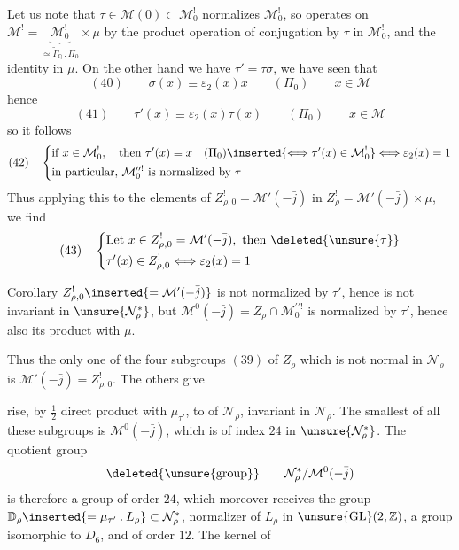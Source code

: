 

Let us note that $\tau\in\mathcal{M}(0)\subset\mathcal{M}_{0}^{!}$
normalizes $\mathcal{M}_{0}^{!}$, so
 operates
 on
$\mathcal{M}^{!}
=\underbrace{\mathcal{M}_{0}^{!}}_{\simeq\widetilde{\Gamma}_{\mathbb{Q}}\mathbin{.}\Pi_{0}}
\times\mu$
by the product operation of conjugation by $\tau$ in
$\mathcal{M}_{0}^{!}$, and the identity in $\mu$.
On the other hand we have $\tau'=\tau\sigma$, we have seen that
\[
 (40)\qquad
 \sigma(x)\equiv\varepsilon_{2}(x)x\qquad(\Pi_{0})
 \qquad x\in\mathcal{M}
\]
hence
\[
 (41)\qquad
 \tau'(x)\equiv\varepsilon_{2}(x)\tau(x)\qquad(\Pi_{0})
 \qquad x\in\mathcal{M}
\]
so it follows
\[
 (42)\quad
 \left\{
 \begin{aligned}
 &\text{if }x\in\mathcal{M}_{0}^{!},\quad
   \text{then }\tau'(x)\equiv x\quad(\Pi_{0})
   \inserted{\Longleftrightarrow\tau'(x)\in\mathcal{M}_{0}^{!}}
   \Longleftrightarrow\varepsilon_{2}(x)=1\\
 &\text{in particular, }\mathcal{M}_{0}^{\prime\prime!}
   \text{ is normalized by }\tau
 \end{aligned}
 \right.
\]
Thus  applying this to the elements of
$Z_{\rho,0}^{!}=\mathcal{M}'(-\bar j)$ in
$Z_{\rho}^{!}=\mathcal{M}'(-\bar j)\times\mu$,
we find
\[
 (43)\quad
 \left\{
 \begin{aligned}
 &\text{Let }x\in Z_{\rho,0}^{!}=\mathcal{M}'(-\bar j),
   \text{ then }\deleted{\unsure{\tau}}\\
 &\tau'(x)\in Z_{\rho,0}^{!}
   \Longleftrightarrow\varepsilon_{2}(x)=1
 \end{aligned}
 \right.
\]

\uline{Corollary}\quad
$Z_{\rho,0}^{!}\inserted{=\mathcal{M}'(-\bar j)}$
is not normalized by $\tau'$, hence is not invariant in
$\unsure{\mathcal{N}_{\rho}^{*}}$,
but 
$\mathcal{M}^{0}(-\bar j)=Z_{\rho}\cap\mathcal{M}_{0}^{\prime\prime!}$
is normalized by $\tau'$, hence also its product with $\mu$.

Thus the only one of the four subgroups $(39)$ of $Z_{\rho}$
which is not normal in $\mathcal{N}_{\rho}$ is
$\mathcal{M}'(-\bar j)=Z_{\rho,0}^{!}$.
The others give



rise, by $\frac12$ direct product with $\mu_{\tau'}$,
to  of $\mathcal{N}_{\rho}$,
invariant in $\mathcal{N}_{\rho}$.
The smallest of all these subgroups is
$\mathcal{M}^{0}(-\bar j)$, which is of index $24$ in
$\unsure{\mathcal{N}_{\rho}^{*}}$.
The quotient group 
\[
 \deleted{\unsure{\text{group}}}\qquad
 \mathcal{N}_{\rho}^{*}/\mathcal{M}^{0}(-\bar j)
\]
is therefore a group of order $24$, which moreover receives the group
$\mathbb{D}_{\rho}
\inserted{=\mu_{\tau'}\mathbin{.}L_{\rho}}
\subset\mathcal{N}_{\rho}^{*}$,
normalizer of $L_{\rho}$ in
$\unsure{\operatorname{GL}}(2,\mathbb{Z})$,
a group isomorphic to $D_{6}$, and of order $12$.
The kernel of

